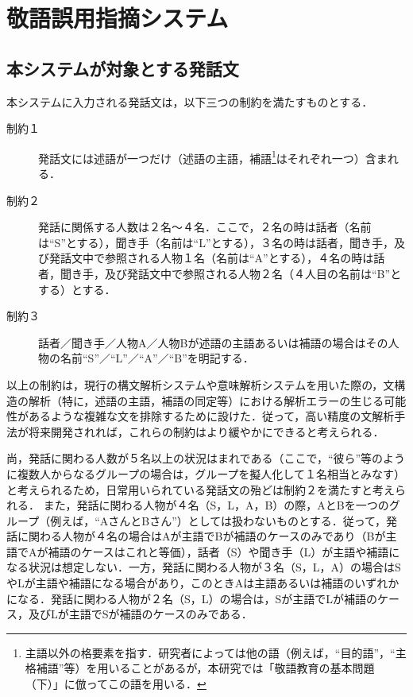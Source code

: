 \section{敬語誤用指摘システム}
\subsection{本システムが対象とする発話文}
本システムに入力される発話文は，以下三つの制約を満たすものとする．

\begin{description}
\item [制約１]発話文には述語が一つだけ（述語の主語，補語\footnote{主語以外の格要素を指す．研究者によっては他の語（例えば，``目的語''，``主格補語''等）を用いることがあるが，本研究では「敬語教育の基本問題（下）」\cite{Kokugoken1992}に倣ってこの語を用いる．}はそれぞれ一つ）含まれる．
\item [制約２]発話に関係する人数は２名〜４名．ここで，２名の時は話者（名前は``S''とする），聞き手（名前は``L''とする），３名の時は話者，聞き手，及び発話文中で参照される人物１名（名前は``A''とする），４名の時は話者，聞き手，及び発話文中で参照される人物２名（４人目の名前は``B''とする）とする．
\item [制約３]話者／聞き手／人物A／人物Bが述語の主語あるいは補語の場合はその人物の名前``S''／``L''／``A''／``B''を明記する．
\end{description}

\bigskip

以上の制約は，現行の構文解析システムや意味解析システムを用いた際の，文構造の解析（特に，述語の主語，補語の同定等）における解析エラーの生じる可能性があるような複雑な文を排除するために設けた．従って，高い精度の文解析手法が将来開発されれば，これらの制約はより緩やかにできると考えられる．

尚，発話に関わる人数が５名以上の状況はまれである（ここで，``彼ら''等のように複数人からなるグループの場合は，グループを擬人化して１名相当とみなす）と考えられるため，日常用いられている発話文の殆どは制約２を満たすと考えられる．
また，発話に関わる人物が４名（S，L，A，B）の際，AとBを一つのグループ（例えば，``AさんとBさん''）としては扱わないものとする．従って，発話に関わる人物が４名の場合はAが主語でBが補語のケースのみであり（Bが主語でAが補語のケースはこれと等価），話者（S）や聞き手（L）が主語や補語になる状況は想定しない．一方，発話に関わる人物が３名（S，L，A）の場合はSやLが主語や補語になる場合があり，このときAは主語あるいは補語のいずれかになる．発話に関わる人物が２名（S，L）の場合は，Sが主語でLが補語のケース，及びLが主語でSが補語のケースのみである．

